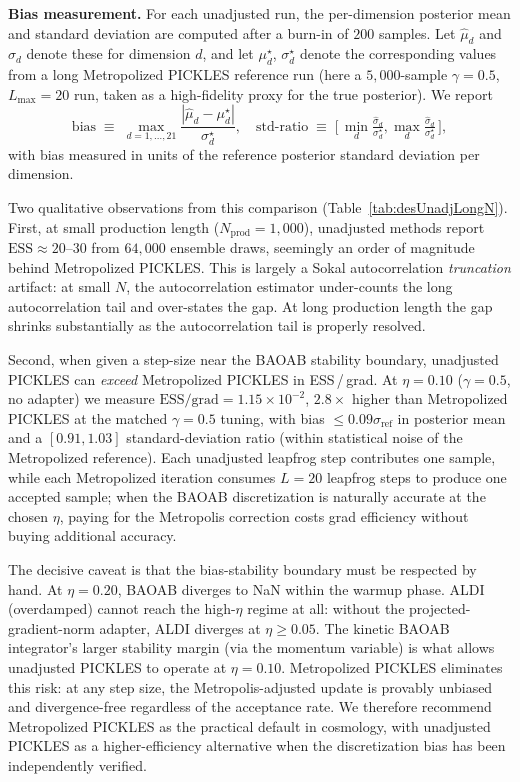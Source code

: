 \documentclass{article}
\begin{document}
\textbf{Bias measurement.} For each unadjusted run, the per-dimension
posterior mean and standard deviation are computed after a burn-in of
$200$ samples. Let $\hat\mu_d$ and $\hat\sigma_d$ denote these for
dimension $d$, and let $\mu_d^\star$, $\sigma_d^\star$ denote the
corresponding values from a long Metropolized PICKLES reference run
(here a $5{,}000$-sample $\gamma\!=\!0.5$, $L_{\max}\!=\!20$ run, taken
as a high-fidelity proxy for the true posterior). We report
\begin{equation}
\text{bias} \;\equiv\; \max_{d=1,\dots,21}
\frac{|\hat\mu_d - \mu_d^\star|}{\sigma_d^\star},
\quad
\text{std-ratio} \;\equiv\;
\Big[\, \min_d \tfrac{\hat\sigma_d}{\sigma_d^\star},
        \max_d \tfrac{\hat\sigma_d}{\sigma_d^\star}\, \Big],
\end{equation}
with bias measured in units of the reference posterior standard
deviation per dimension.

Two qualitative observations from this comparison
(Table~\ref{tab:desUnadjLongN}). First, at small production length
($N_{\text{prod}}\!=\!1{,}000$), unadjusted methods report
$\text{ESS}\!\approx\!20$--$30$ from $64{,}000$ ensemble draws,
seemingly an order of magnitude behind Metropolized PICKLES. This is
largely a Sokal autocorrelation \emph{truncation} artifact: at small
$N$, the autocorrelation estimator under-counts the long
autocorrelation tail and over-states the gap. At long production
length the gap shrinks substantially as the autocorrelation tail is
properly resolved.

Second, when given a step-size near the BAOAB stability boundary,
unadjusted PICKLES can \emph{exceed} Metropolized PICKLES in
ESS\,/\,grad. At $\eta\!=\!0.10$ ($\gamma\!=\!0.5$, no adapter) we
measure $\text{ESS}/\text{grad}\!=\!1.15\!\times\!10^{-2}$,
$2.8\!\times$ higher than Metropolized PICKLES at the matched
$\gamma=0.5$ tuning, with bias $\le\!0.09\sigma_{\text{ref}}$ in
posterior mean and a $[0.91, 1.03]$ standard-deviation ratio (within
statistical noise of the Metropolized reference). Each unadjusted
leapfrog step contributes one sample, while each Metropolized
iteration consumes $L\!=\!20$ leapfrog steps to produce one accepted
sample; when the BAOAB discretization is naturally accurate at the
chosen $\eta$, paying for the Metropolis correction costs grad
efficiency without buying additional accuracy.

The decisive caveat is that the bias-stability boundary must be
respected by hand. At $\eta\!=\!0.20$, BAOAB diverges to NaN within
the warmup phase. ALDI (overdamped) cannot reach the high-$\eta$
regime at all: without the projected-gradient-norm adapter, ALDI
diverges at $\eta\!\ge\!0.05$. The kinetic BAOAB integrator's larger
stability margin (via the momentum variable) is what allows
unadjusted PICKLES to operate at $\eta=0.10$. Metropolized PICKLES
eliminates this risk: at any step size, the Metropolis-adjusted update
is provably unbiased and divergence-free regardless of the acceptance
rate. We therefore recommend Metropolized PICKLES as the practical
default in cosmology, with unadjusted PICKLES as a higher-efficiency
alternative when the discretization bias has been independently
verified.
\end{document}
